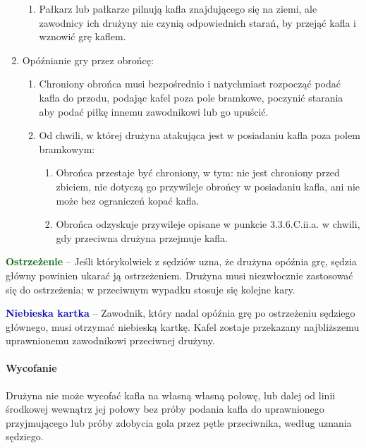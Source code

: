 \documentclass[12pt]{article}
\newcommand\bluecard[1]{\bgroup\textcolor{blue}{\textbf{#1}}}
\newcommand\other[1]{\bgroup\textcolor{darkgreen}{\textbf{#1}}}
\begin{document}
\begin{enumerate}
\begin{enumerate}
		      \item Pałkarz lub pałkarze pilnują kafla znajdującego się na ziemi, ale
		            zawodnicy ich drużyny nie czynią odpowiednich starań, by przejąć kafla i
		            wznowić grę kaflem.
	      \end{enumerate}

	\item Opóźnianie gry przez obrońcę:
	      \begin{enumerate}
		      \item Chroniony obrońca musi bezpośrednio i natychmiast rozpocząć podać
		            kafla do przodu, podając kafel poza pole bramkowe, poczynić starania aby
		            podać piłkę innemu zawodnikowi lub go upuścić.

		      \item Od chwili, w której drużyna atakująca jest w posiadaniu kafla poza
		            polem bramkowym:
		            \begin{enumerate}
			            \item Obrońca przestaje być chroniony, w tym: nie jest chroniony przed
			                  zbiciem, nie dotyczą go przywileje obrońcy w posiadaniu kafla, ani nie
			                  może bez ograniczeń kopać kafla.

			            \item Obrońca odzyskuje przywileje opisane w punkcie 3.3.6.C.ii.a.
			                  w chwili, gdy przeciwna drużyna przejmuje kafla.
		            \end{enumerate}
	      \end{enumerate}
\end{enumerate}

\other{Ostrzeżenie} -- Jeśli którykolwiek z sędziów uzna, że drużyna
opóźnia grę, sędzia główny powinien ukarać ją ostrzeżeniem. Drużyna musi
niezwłocznie zastosować się do ostrzeżenia; w przeciwnym wypadku stosuje
się kolejne kary.

\bluecard{Niebieska kartka} -- Zawodnik, który nadal opóźnia grę po
ostrzeżeniu sędziego głównego, musi otrzymać niebieską kartkę. Kafel
zostaje przekazany najbliższemu uprawnionemu zawodnikowi przeciwnej
drużyny.

\paragraph{Wycofanie}
Drużyna nie może wycofać kafla na własną
własną połowę, lub dalej od linii środkowej wewnątrz jej połowy bez
próby podania kafla do uprawnionego przyjmującego lub próby zdobycia
gola przez pętle przeciwnika, według uznania sędziego.
\end{document}
